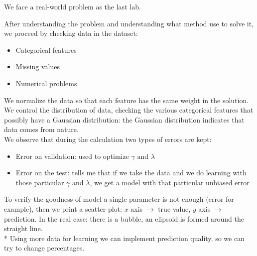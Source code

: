 We face a real-world problem as the last lab.

After understanding the problem and understanding what method use to solve it, we proceed by checking data in the dataset:
\begin{itemize}
	
	\item Categorical features
	\item Missing values
	\item Numerical problems
	
\end{itemize}
We normalize the data so that each feature has the same weight in the solution.
We control the distribution of data, checking the various categorical features that possibly have a Gaussian distribution: the Gaussian distribution indicates that data comes from nature.\\
We observe that during the calculation two types of errors are kept:
\begin{itemize}
	
	\item Error on validation: used to optimize $\gamma$ and $\lambda$
	\item Error on the test: tells me that if we take the data and we do learning with those particular $\gamma$ and $\lambda$, we get a model with that particular unbiased error

	
\end{itemize}
To verify the goodness of model a single parameter is not enough (error for example), then we print a scatter plot: $x$ axis $\rightarrow$ true value, $y$ axis $\rightarrow$ prediction.
In the real case: there is a bubble, an elipsoid is formed around the straight line.\\*
Using more data for learning we can implement prediction quality, so we can try to change percentages.

